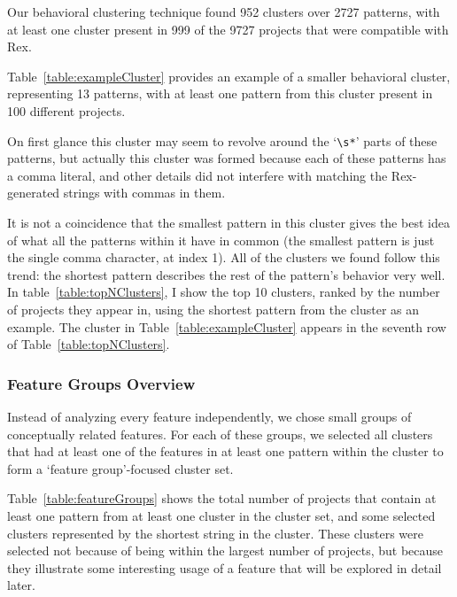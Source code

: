 
Our behavioral clustering technique found 952 clusters over 2727 patterns, with at least one cluster present in 999 of the 9727 projects that were compatible with Rex.


Table~\ref{table:exampleCluster} provides an example of a smaller behavioral cluster, representing 13 patterns, with at least one pattern from this cluster present in 100 different projects.

On first glance this cluster may seem to revolve around the `\verb!\s*!' parts of these patterns, but actually this cluster was formed because each of these patterns has a comma literal, and other details did not interfere with matching the Rex-generated strings with commas in them.

It is not a coincidence that the smallest pattern in this cluster gives the best idea of what all the patterns within it have in common (the smallest pattern is just the single comma character, at index 1).  All of the clusters we found follow this trend: the shortest pattern describes the rest of the pattern's behavior very well.  In table~\ref{table:topNClusters}, I show the top 10 clusters, ranked by the number of projects they appear in, using the shortest pattern from the cluster as an example.
The cluster in Table~\ref{table:exampleCluster} appears in the seventh row of Table~\ref{table:topNClusters}.



\subsubsection{Feature Groups Overview}
Instead of analyzing every feature independently, we chose small groups of conceptually related features.  For each of these groups, we selected all clusters that had at least one of the features in at least one pattern within the cluster to form a `feature group'-focused cluster set.

Table~\ref{table:featureGroups} shows the total number of projects that contain at least one pattern from at least one cluster in the cluster set, and some selected clusters represented by the shortest string in the cluster.  These clusters were selected not because of being within the largest number of projects, but because they illustrate some interesting usage of a feature that will be explored in detail later.

